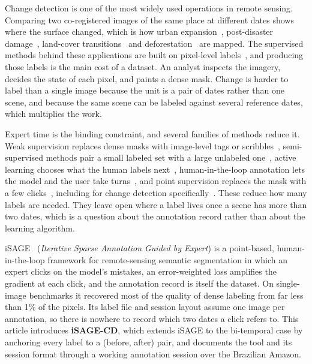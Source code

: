 
Change detection is one of the most widely used operations in remote
sensing. Comparing two co-registered images of the same place at
different dates shows where the surface changed, which is how urban
expansion~\cite{chen2020spatial}, post-disaster
damage~\cite{gupta2019xbd}, land-cover
transitions~\cite{yang2021asymmetric} and
deforestation~\cite{prodes,mapbiomas} are mapped. The supervised
methods behind these applications are built on pixel-level
labels~\cite{daudt2018fully,khelifi2020deep}, and producing those
labels is the main cost of a dataset. An analyst inspects the imagery,
decides the state of each pixel, and paints a dense mask. Change is
harder to label than a single image because the unit is a pair of
dates rather than one scene, and because the same scene can be
labeled against several reference dates, which multiplies the work.

Expert time is the binding constraint, and several families of methods
reduce it. Weak supervision replaces dense masks with image-level tags
or scribbles~\cite{lin2016scribblesup,hua2021semantic}, semi-supervised
methods pair a small labeled set with a large unlabeled
one~\cite{zhou2026decaf}, active learning chooses what the human
labels next~\cite{ren2021survey}, human-in-the-loop annotation lets
the model and the user take turns~\cite{amershi2014power,lenczner2022dial},
and point supervision replaces the mask with a few
clicks~\cite{Bearman2016}, including for change detection
specifically~\cite{fang2024point}. These reduce how many labels are
needed. They leave open where a label lives once a scene has more than
two dates, which is a question about the annotation record rather than
about the learning algorithm.

iSAGE~\cite{isage} (\emph{Iterative Sparse Annotation Guided by
Expert}) is a point-based, human-in-the-loop framework for
remote-sensing semantic segmentation in which an expert clicks on the
model's mistakes, an error-weighted loss amplifies the gradient at
each click, and the annotation record is itself the dataset. On
single-image benchmarks it recovered most of the quality of dense
labeling from far less than 1\% of the pixels. Its label file and
session layout assume one image per annotation, so there is nowhere to
record which two dates a click refers to. This article introduces
\textbf{iSAGE-CD}, which extends iSAGE to the bi-temporal case by
anchoring every label to a (before, after) pair, and documents the
tool and its session format through a working annotation session over
the Brazilian Amazon.

